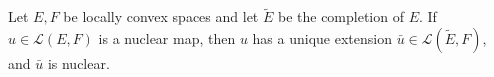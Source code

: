 Let $E, F$ be locally convex spaces and let $\tilde{E}$ be the completion of $E$. If $u \in \mathcal{L}(E, F)$ is a nuclear map, then $u$ has a unique extension $\bar{u} \in \mathcal{L}(\tilde{E}, F)$, and $\bar{u}$ is nuclear.
